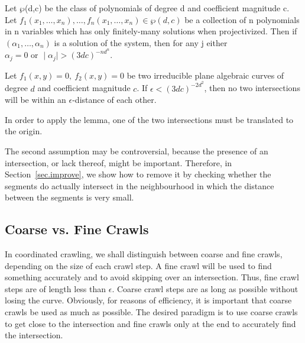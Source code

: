 \begin{lemma}
\label{thm-gap}
Let $\wp$(d,c) be the class of polynomials of degree d and coefficient magnitude c.
Let $f_{1}(x_{1},\ldots,x_{n}),\ldots,f_{n}(x_{1},\ldots,x_{n}) \in \wp(d,c)$
be a collection of n polynomials in n variables which has only 
finitely-many solutions when projectivized.
Then if $(\alpha_{1},\ldots,\alpha_{n})$ is a solution of the system,
then for any j either
$\alpha_{j} = 0 \mbox{\ \ \ \ or \ \ \ } \mid \alpha_{j} \mid > (3dc)^{-nd^{n}}$. \QED
\end{lemma}

\begin{corollary}
\label{cor-gap}
Let $f_{1}(x,y) = 0,\ f_{2}(x,y) = 0$ be two irreducible plane algebraic curves of degree 
$d$ and coefficient magnitude $c$.
If $\epsilon < (3dc)^{-2d^{2}}$, then no two intersections will 
be within an $\epsilon$-distance of each other.
%
%
\end{corollary}
In order to apply the lemma, one of the two intersections must be translated to the origin.
\QED

The second assumption may be controversial, because the presence of an 
intersection, or lack thereof, might be important.
Therefore, in Section~\ref{sec.improve}, we show how to remove it by checking whether the segments 
do actually intersect in the neighbourhood in which the distance between the segments is very 
small.  %

\subsection{Coarse vs. Fine Crawls}

In coordinated crawling, we shall distinguish between coarse and fine crawls, depending on
the size of each crawl step.
A fine crawl will be used to find something accurately and to avoid skipping over an intersection.
Thus, fine crawl steps are of length less than $\epsilon$.
Coarse crawl steps are as long as possible without losing the curve.
Obviously, for reasons of efficiency, it is important that coarse crawls be used as much as 
possible.
The desired paradigm is to use coarse crawls to get close to the intersection and 
fine crawls only at the end to accurately find the intersection.


